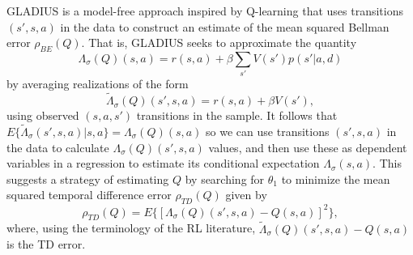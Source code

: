 GLADIUS is a model-free approach inspired
by Q-learning that uses transitions $(s',s,a)$ in the data to construct an 
estimate of the mean squared Bellman error $\rho_{BE}(Q)$. That is, GLADIUS seeks to approximate the quantity
\begin{equation}
\Lambda_\sigma(Q)(s,a)=r(s,a)+\beta \sum_{s'} V(s')p(s'|a,d)
\label{eq:Lambda}
\end{equation}
by averaging realizations of the form 
\begin{equation}
   \tilde\Lambda_\sigma(Q)(s',s,a) = r(s,a)+\beta V(s'),
\label{eq:Lambdadraw}
\end{equation}
using observed $(s,a,s')$ transitions in the sample. It follows that
$E\{\tilde\Lambda_\sigma(s',s,a)|s,a\}=\Lambda_\sigma(Q)(s,a)$ so 
we can use transitions $(s',s,a)$ in the data to calculate
 $\Lambda_\sigma(Q)(s',s,a)$ values, and then use these as dependent variables
in a regression to estimate its conditional expectation  $\Lambda_\sigma(s,a)$.
This suggests a strategy of  estimating $Q$ by searching for $\theta_1$ to minimize
the mean squared temporal difference error $\rho_{TD}(Q)$
given by
\begin{equation}
        \rho_{TD}(Q)=E\{[\Lambda_\sigma(Q)(s',s,a)-Q(s,a)]^2\},
\end{equation}
where, using the terminology of the RL literature,  $\tilde\Lambda_\sigma(Q)(s',s,a)-Q(s,a)$ is the TD error.

